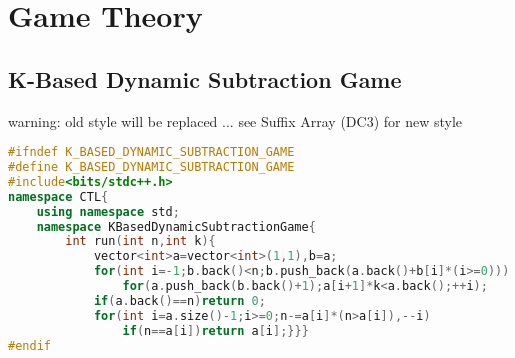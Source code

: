 \documentclass{book}
\begin{document}
\chapter{Game Theory}
\newpage
{}
\section{K-Based Dynamic Subtraction Game}
warning: old style will be replaced ... see Suffix Array (DC3) for new style\begin{lstlisting}[language=C++,title={K-Based Dynamic Subtraction Game.hpp (565 bytes, 14 lines)}]
#ifndef K_BASED_DYNAMIC_SUBTRACTION_GAME
#define K_BASED_DYNAMIC_SUBTRACTION_GAME
#include<bits/stdc++.h>
namespace CTL{
    using namespace std;
    namespace KBasedDynamicSubtractionGame{
        int run(int n,int k){
            vector<int>a=vector<int>(1,1),b=a;
            for(int i=-1;b.back()<n;b.push_back(a.back()+b[i]*(i>=0)))
                for(a.push_back(b.back()+1);a[i+1]*k<a.back();++i);
            if(a.back()==n)return 0;
            for(int i=a.size()-1;i>=0;n-=a[i]*(n>a[i]),--i)
                if(n==a[i])return a[i];}}}
#endif\end{lstlisting}
\end{document}

